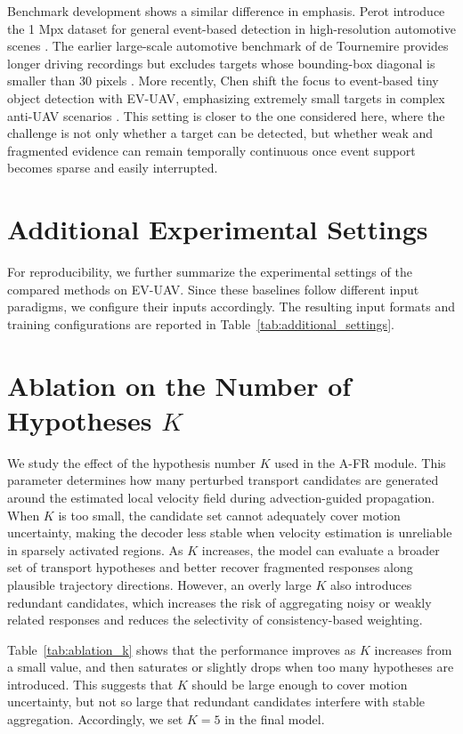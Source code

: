 \documentclass[runningheads]{llncs}
\begin{document}
Benchmark development shows a similar difference in emphasis. 
Perot \etal introduce the 1 Mpx dataset for general event-based detection in high-resolution automotive scenes \cite{perot2020learning}.
The earlier large-scale automotive benchmark of de Tournemire \etal provides longer driving recordings but excludes targets whose bounding-box diagonal is smaller than 30 pixels \cite{detournemire2020automotive}. 
More recently, Chen \etal shift the focus to event-based tiny object detection with EV-UAV, emphasizing extremely small targets in complex anti-UAV scenarios \cite{chen2025event}. 
This setting is closer to the one considered here, where the challenge is not only whether a target can be detected, but whether weak and fragmented evidence can remain temporally continuous once event support becomes sparse and easily interrupted.

\section{Additional Experimental Settings}
For reproducibility, we further summarize the experimental settings of the compared methods on EV-UAV. Since these baselines follow different input paradigms, we configure their inputs accordingly. The resulting input formats and training configurations are reported in Table~\ref{tab:additional_settings}.

\section{Ablation on the Number of Hypotheses $K$}
We study the effect of the hypothesis number $K$ used in the A-FR module. 
This parameter determines how many perturbed transport candidates are generated around the estimated local velocity field during advection-guided propagation. 
When $K$ is too small, the candidate set cannot adequately cover motion uncertainty, making the decoder less stable when velocity estimation is unreliable in sparsely activated regions. 
As $K$ increases, the model can evaluate a broader set of transport hypotheses and better recover fragmented responses along plausible trajectory directions. 
However, an overly large $K$ also introduces redundant candidates, which increases the risk of aggregating noisy or weakly related responses and reduces the selectivity of consistency-based weighting.

Table~\ref{tab:ablation_k} shows that the performance improves as $K$ increases from a small value, and then saturates or slightly drops when too many hypotheses are introduced. 
This suggests that $K$ should be large enough to cover motion uncertainty, but not so large that redundant candidates interfere with stable aggregation. 
Accordingly, we set $K=5$ in the final model.
\end{document}
